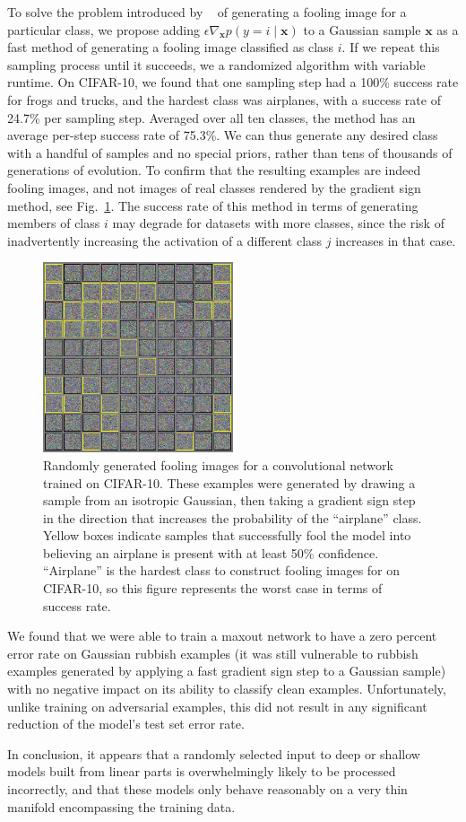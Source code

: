 \documentclass{article} %
\def\eps{{\epsilon}}
\def\vx{{\bm{x}}}
\begin{document}
To solve the problem introduced by ~\citet{fool} of generating a fooling image for a particular
class, we propose adding $\eps \nabla_\vx p(y = i \mid \vx)$ to a Gaussian sample $\vx$ as
a fast method of generating a fooling image classified as class $i$. If we repeat this
sampling process until it succeeds, we a randomized algorithm
with variable runtime. On CIFAR-10, we found that one sampling step had a 100\% success rate for
frogs and trucks, and the hardest class was airplanes, with a success rate of 24.7\% per sampling
step. Averaged over all ten classes, the method has an average per-step success rate of 75.3\%.
We can thus generate any desired class with a handful of samples and no special priors,
rather than tens of thousands of generations of evolution. To confirm that the resulting examples
are indeed fooling images, and not images of real classes rendered by the gradient sign method,
see Fig.~\ref{fig:airplane}. The success rate of this method in terms of generating members of
class $i$ may degrade for datasets with more classes, since the risk of inadvertently increasing
the activation of a different class $j$ increases in that case.
\begin{figure}
\centering
\includegraphics[width=0.5\textwidth]{airplane.png}
\caption{
Randomly generated fooling images for a convolutional network trained on CIFAR-10.
These examples were generated by drawing a sample from an isotropic Gaussian, then
taking a gradient sign step in the direction that increases the probability of the
``airplane'' class. Yellow boxes indicate samples that successfully fool the model
into believing an airplane is present with at least 50\% confidence. ``Airplane'' is
the hardest class to construct fooling images for on CIFAR-10, so this figure
represents the worst case in terms of success rate.
}
\vspace{-.25in}
\label{fig:airplane}
\end{figure}
We found that we were able to train a maxout network to have a zero percent error rate on Gaussian
rubbish examples (it was still vulnerable to rubbish examples generated by applying a fast gradient
sign step to a Gaussian sample)
with no negative impact on its ability to classify clean examples. Unfortunately, unlike
training on adversarial examples, this did not result in any significant reduction of the model's
test set error rate.

In conclusion, it appears that a randomly selected input to deep or shallow models built from
linear parts is overwhelmingly
likely to be processed incorrectly, and that these models only behave reasonably on a very
thin manifold encompassing the training data.
\end{document}
